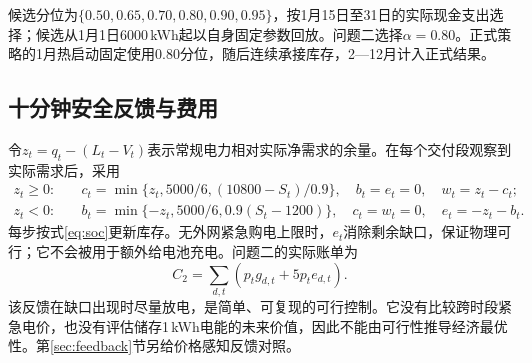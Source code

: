 候选分位为$\{0.50,0.65,0.70,0.80,0.90,0.95\}$，按1月15日至31日的实际现金支出选择；候选从1月1日6000\,kWh起以自身固定参数回放。问题二选择$\alpha=0.80$。正式策略的1月热启动固定使用0.80分位，随后连续承接库存，2—12月计入正式结果。

\subsection{十分钟安全反馈与费用}
令$z_t=q_t-(L_t-V_t)$表示常规电力相对实际净需求的余量。在每个交付段观察到实际需求后，采用
\begin{align}
 z_t\ge0:&\quad c_t=\min\{z_t,5000/6,(10800-S_t)/0.9\},\quad b_t=e_t=0,\quad w_t=z_t-c_t;\\
 z_t<0:&\quad b_t=\min\{-z_t,5000/6,0.9(S_t-1200)\},\quad c_t=w_t=0,\quad e_t=-z_t-b_t.
\end{align}
每步按式\eqref{eq:soc}更新库存。无外网紧急购电上限时，$e_t$消除剩余缺口，保证物理可行；它不会被用于额外给电池充电。问题二的实际账单为
\begin{equation}
 C_2=\sum_{d,t}\left(p_tg_{d,t}+5p_te_{d,t}\right).
\end{equation}
该反馈在缺口出现时尽量放电，是简单、可复现的可行控制。它没有比较跨时段紧急电价，也没有评估储存1\,kWh电能的未来价值，因此不能由可行性推导经济最优性。第\ref{sec:feedback}节另给价格感知反馈对照。
